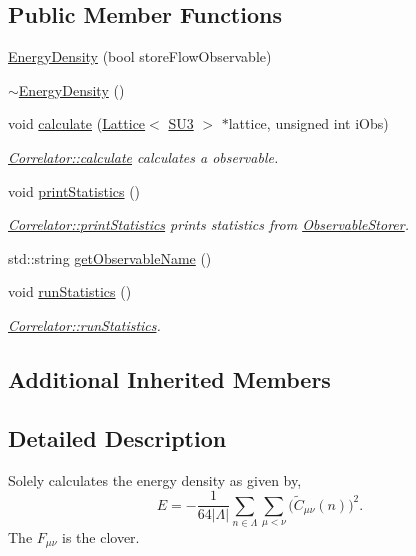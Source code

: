\subsection*{Public Member Functions}
\begin{DoxyCompactItemize}
\item 
\mbox{\hyperlink{class_energy_density_a1d23cfe5690c9daf8b2f0ec8f6471c5f}{Energy\+Density}} (bool store\+Flow\+Observable)
\item 
\mbox{\hyperlink{class_energy_density_a307e031858ac7149f5689911f8ff22fb}{$\sim$\+Energy\+Density}} ()
\item 
void \mbox{\hyperlink{class_energy_density_ae8e5e29257104d881bcabeadc3b2c9e7}{calculate}} (\mbox{\hyperlink{class_lattice}{Lattice}}$<$ \mbox{\hyperlink{class_s_u3}{S\+U3}} $>$ $\ast$lattice, unsigned int i\+Obs)
\begin{DoxyCompactList}\small\item\em \mbox{\hyperlink{class_correlator_ab33502ff305f891c5c2e6d66a26a0247}{Correlator\+::calculate}} calculates a observable. \end{DoxyCompactList}\item 
void \mbox{\hyperlink{class_energy_density_ad108e32bc670f17f15b4ed433d8bbec7}{print\+Statistics}} ()
\begin{DoxyCompactList}\small\item\em \mbox{\hyperlink{class_correlator_a2168d677f547769784781d2e2aaa53cf}{Correlator\+::print\+Statistics}} prints statistics from \mbox{\hyperlink{class_observable_storer}{Observable\+Storer}}. \end{DoxyCompactList}\item 
std\+::string \mbox{\hyperlink{class_energy_density_a59b320595bca439333d36e3753ca07f0}{get\+Observable\+Name}} ()
\item 
void \mbox{\hyperlink{class_energy_density_a584e164453ce880a45478c9b48ce2c4b}{run\+Statistics}} ()
\begin{DoxyCompactList}\small\item\em \mbox{\hyperlink{class_correlator_a35197b1d12b62ef30b79c0138a26456e}{Correlator\+::run\+Statistics}}. \end{DoxyCompactList}\end{DoxyCompactItemize}
\subsection*{Additional Inherited Members}


\subsection{Detailed Description}
Solely calculates the energy density as given by, \[ E = -\frac{1}{64|\Lambda|} \sum_{n\in\Lambda}\sum_{\mu<\nu} \big(\tilde{C}_{\mu\nu}(n)\big)^2. \] The $F_{\mu\nu}$ is the clover. 

